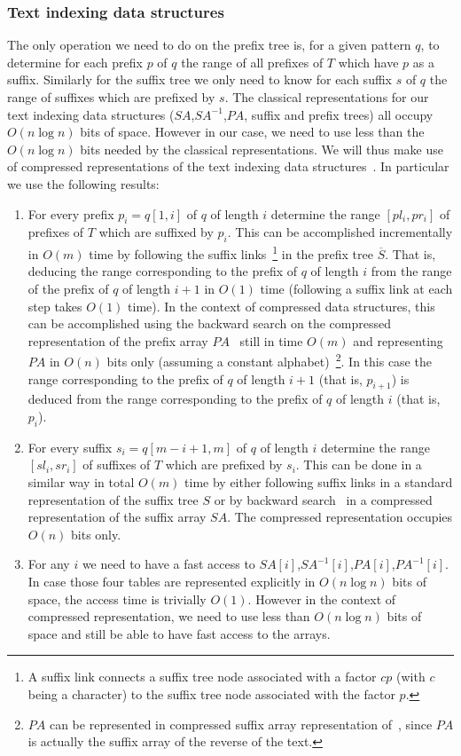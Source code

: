 \documentclass{article}
\newcommand{\?}{\mskip1.5mu}
\begin{document}
\subsubsection{Text indexing data structures}
The only operation we need to do on the prefix tree is, for a given pattern $q$, to determine for each prefix $p$ of $q$ the range of all prefixes of $T$ which have $p$ as a suffix. Similarly for the suffix tree we only need to know for each suffix $s$ of $q$ the range of suffixes which are prefixed by $s$. 
The classical representations for our text indexing data structures ($SA$,$SA^{-1}$,$PA$, suffix and prefix trees) all occupy $O(n\log n)$ bits of space. However in our case, we need to use less than the $O(n\log n)$ bits needed by the classical representations. We will thus make use of compressed representations of the text indexing data structures~\cite{FM05,GV05}. In particular we use the following results: 
\begin{enumerate}
\item For every prefix $p_i=q[1,i]$ of $q$ of length $i$ determine the range $[pl_i,pr_i]$ of prefixes of $T$ which are suffixed by $p_i$. This can be  accomplished incrementally in $O(m)$ time by following the suffix links~\footnote{A suffix link connects a suffix tree node associated with a factor $cp$ (with $c$ being a character) to the suffix tree node associated with the factor $p$.} in the prefix tree $\overline{S}$. That is, deducing the range corresponding to the prefix of $q$ of length $i$ from the range of the prefix of $q$ of length $i+1$ in $O(1)$ time (following a suffix link at each step takes $O(1)$ time). In the context of compressed data structures, this can be accomplished using the backward search on the compressed representation of the prefix array $PA$~\cite{FM05} still in time $O(m)$ and representing $PA$ in $O(n)$ bits only (assuming a constant alphabet)~\footnote{$PA$ can be represented in compressed suffix array representation of~\cite{FM05}, since $PA$ is actually the suffix array of the reverse of the text.}. In this case the range corresponding to the prefix of $q$ of length $i+1$ (that is, $p_{i+1}$) is deduced from the range corresponding to the prefix of $q$ of length $i$ (that is, $p_i$). 

\item For every suffix $s_i=q[m-i+1,m]$ of $q$ of length $i$ determine the range $[sl_i,sr_i]$ of suffixes of $T$ which are prefixed by $s_i$. This can be done in a similar way in total $O(m)$ time by either following suffix links in a standard representation of the suffix tree $S$ or by backward search~\cite{FM05} in a compressed representation of the suffix array $SA$. The compressed representation occupies $O(n)$ bits only.  
\item For any $i$ we need to have a fast access to $SA[i]$,$SA^{-1}[i]$,$PA[i]$,$PA^{-1}[i]$. In case those four tables are represented  explicitly in $O(n\log n)$ bits of space, the access time is trivially $O(1)$. However in the context of compressed representation, we need to use less than $O(n\log n)$ bits of space and still be able to have fast access to the arrays. 
\end{enumerate}
\end{document}
